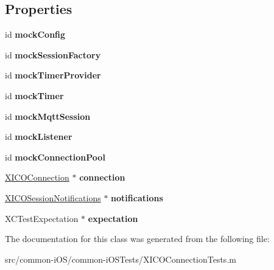 \subsection*{Properties}
\begin{DoxyCompactItemize}
\item 
\hypertarget{interface_x_i_c_o_connection_tests_abc6b42b71744b059972faa9d72e03e47}{}\label{interface_x_i_c_o_connection_tests_abc6b42b71744b059972faa9d72e03e47} 
id {\bfseries mock\+Config}
\item 
\hypertarget{interface_x_i_c_o_connection_tests_a7b86c4251e8cd2606e9a56a392055f1a}{}\label{interface_x_i_c_o_connection_tests_a7b86c4251e8cd2606e9a56a392055f1a} 
id {\bfseries mock\+Session\+Factory}
\item 
\hypertarget{interface_x_i_c_o_connection_tests_a2f400afae7dd4b81cbb6a308d96655aa}{}\label{interface_x_i_c_o_connection_tests_a2f400afae7dd4b81cbb6a308d96655aa} 
id {\bfseries mock\+Timer\+Provider}
\item 
\hypertarget{interface_x_i_c_o_connection_tests_a133bccc11995f6ba9bf69a57bcd51dd6}{}\label{interface_x_i_c_o_connection_tests_a133bccc11995f6ba9bf69a57bcd51dd6} 
id {\bfseries mock\+Timer}
\item 
\hypertarget{interface_x_i_c_o_connection_tests_a3f81a9ed4bbb519e1cf514f9dbef02f5}{}\label{interface_x_i_c_o_connection_tests_a3f81a9ed4bbb519e1cf514f9dbef02f5} 
id {\bfseries mock\+Mqtt\+Session}
\item 
\hypertarget{interface_x_i_c_o_connection_tests_a9595d3cd5575fd231029f9ea393fb337}{}\label{interface_x_i_c_o_connection_tests_a9595d3cd5575fd231029f9ea393fb337} 
id {\bfseries mock\+Listener}
\item 
\hypertarget{interface_x_i_c_o_connection_tests_a6daeb0c8f47ae6fb85165523d08a185b}{}\label{interface_x_i_c_o_connection_tests_a6daeb0c8f47ae6fb85165523d08a185b} 
id {\bfseries mock\+Connection\+Pool}
\item 
\hypertarget{interface_x_i_c_o_connection_tests_af5327ff067893bb0d0a1eead2eef9cd5}{}\label{interface_x_i_c_o_connection_tests_af5327ff067893bb0d0a1eead2eef9cd5} 
\hyperlink{interface_x_i_c_o_connection}{X\+I\+C\+O\+Connection} $\ast$ {\bfseries connection}
\item 
\hypertarget{interface_x_i_c_o_connection_tests_adb35682b113711e68af20ab4656d6718}{}\label{interface_x_i_c_o_connection_tests_adb35682b113711e68af20ab4656d6718} 
\hyperlink{interface_x_i_c_o_session_notifications}{X\+I\+C\+O\+Session\+Notifications} $\ast$ {\bfseries notifications}
\item 
\hypertarget{interface_x_i_c_o_connection_tests_ac8d56a6caee830c73a396a8348c2f743}{}\label{interface_x_i_c_o_connection_tests_ac8d56a6caee830c73a396a8348c2f743} 
X\+C\+Test\+Expectation $\ast$ {\bfseries expectation}
\end{DoxyCompactItemize}


The documentation for this class was generated from the following file\+:\begin{DoxyCompactItemize}
\item 
src/common-\/i\+O\+S/common-\/i\+O\+S\+Tests/X\+I\+C\+O\+Connection\+Tests.\+m\end{DoxyCompactItemize}
